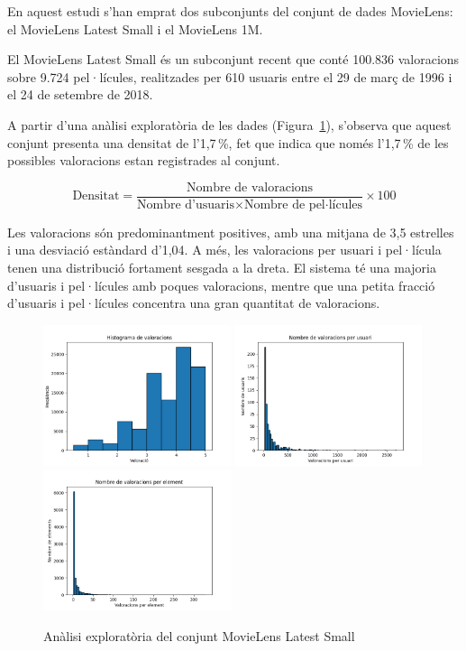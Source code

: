 \documentclass[a4paper,12pt]{report}
\begin{document}
En aquest estudi s’han emprat dos subconjunts del conjunt de dades MovieLens: el MovieLens Latest Small i el MovieLens 1M.

El MovieLens Latest Small és un subconjunt recent que conté 100.836 valoracions sobre 9.724 pel·lícules, realitzades per 610 usuaris entre el 29 de març de 1996 i el 24 de setembre de 2018.

A partir d’una anàlisi exploratòria de les dades (Figura~\ref{fig:analisis_ml_small}), s’observa que aquest conjunt presenta una densitat de l’1,7\,\%, fet que indica que només l’1,7\,\% de les possibles valoracions estan registrades al conjunt.

\[
\text{Densitat} = \frac{\text{Nombre de valoracions}}{\text{Nombre d’usuaris} \times \text{Nombre de pel·lícules}} \times 100
\]

Les valoracions són predominantment positives, amb una mitjana de 3,5 estrelles i una desviació estàndard d’1,04.
A més, les valoracions per usuari i pel·lícula tenen una distribució fortament sesgada a la dreta.
El sistema té una majoria d'usuaris i pel·lícules amb poques valoracions, mentre que una petita fracció d’usuaris i pel·lícules concentra una gran quantitat de valoracions.

\begin{figure}[H]
    \centering
    \includegraphics[width=0.49\textwidth]{Figuras/ml-small-ratings.png}
    \hfill
    \includegraphics[width=0.49\textwidth]{Figuras/ml-small-users.png}
    \hfill
    \includegraphics[width=0.49\textwidth]{Figuras/ml-small-items.png}
    \caption{Anàlisi exploratòria del conjunt MovieLens Latest Small}
    \label{fig:analisis_ml_small}
\end{figure}
\end{document}
